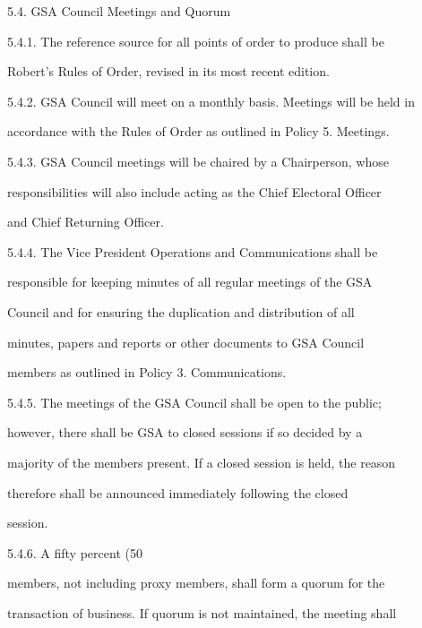 5.4.         GSA Council Meetings and Quorum  



5.4.1. The  reference  source  for  all  points  of  order  to  produce  shall  be  

        Robert’s Rules of Order, revised in its most recent edition.  



5.4.2. GSA Council will meet on a monthly basis. Meetings will be held in  

        accordance with the Rules of Order as outlined in Policy 5. Meetings.  



5.4.3. GSA  Council  meetings  will  be  chaired  by  a  Chairperson,  whose  

        responsibilities will also include acting as the Chief Electoral Officer  

        and Chief Returning Officer.  



5.4.4. The      Vice     President     Operations       and    Communications           shall   be  

        responsible  for  keeping  minutes  of  all  regular  meetings  of  the  GSA  

        Council   and   for   ensuring  the   duplication  and   distribution   of   all  

        minutes,  papers  and  reports  or  other  documents  to  GSA  Council  

        members as outlined in Policy 3. Communications.  



5.4.5. The  meetings  of  the  GSA   Council  shall  be  open  to  the  public;  

        however,  there  shall  be  GSA  to  closed  sessions  if  so  decided  by  a  

        majority of the members present. If a closed session is held, the reason  

        therefore   shall   be   announced   immediately   following   the   closed  

        session.  



5.4.6. A  fifty  percent  (50%

        members, not including proxy members, shall form a quorum for the  

        transaction of business. If quorum is not maintained, the meeting shall  


